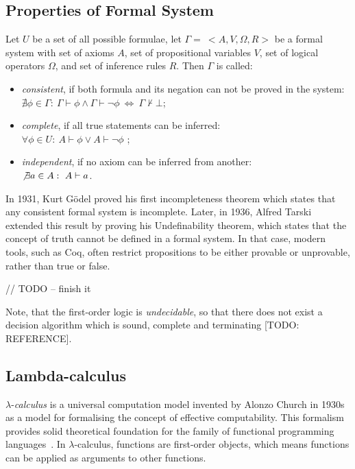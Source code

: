 \documentclass[article]{aaltoseries}
\begin{document}
\subsection{Properties of Formal System}

Let $U$ be a set of all possible formulae, let $\Gamma = \ <A, V, \Omega, R>$ be a formal system with set of axioms $A$, set of propositional variables $V$, set of logical operators $\Omega$, and set of inference rules $R$. Then $\Gamma$ is called:
\begin{itemize}
	\itemsep0em
	\item \textit{consistent}, if both formula and its negation can not be proved in the system: \\
		$\nexists \phi \in \Gamma: \ \Gamma \vdash \phi \land \Gamma \vdash \neg \phi  \ \Leftrightarrow \ \Gamma \nvdash \bot$;
	\item \textit{complete}, if all true statements can be inferred: \\
		$\forall \phi \in U: \ A \vdash \phi \lor A \vdash \neg \phi$ ;
	\item \textit{independent}, if no axiom can be inferred from another: \\
		$\not \exists a \in A: \ A \vdash a$.
\end{itemize}

In 1931, Kurt Gödel proved his first incompleteness theorem which states that any consistent formal system is incomplete. Later, in 1936, Alfred Tarski extended this result by proving his Undefinability theorem, which states that the concept of truth cannot be defined in a formal system. %
In that case, modern tools, such as Coq, often restrict propositions to be either provable or unprovable, rather than true or false.


// TODO -- finish it


Note, that the first-order logic is \textit{undecidable}, so that there does not exist a decision algorithm which is sound, complete and terminating [TODO: REFERENCE]. %


\subsection{Lambda-calculus}

$\lambda$-\textit{calculus} is a universal computation model invented by Alonzo Church in 1930s as a model for formalising the concept of effective computability.  This formalism provides solid theoretical foundation for the family of functional programming languages~\cite{Roj15}. In $\lambda$-calculus, functions are first-order objects, which means functions can be applied as arguments to other functions.
\end{document}
